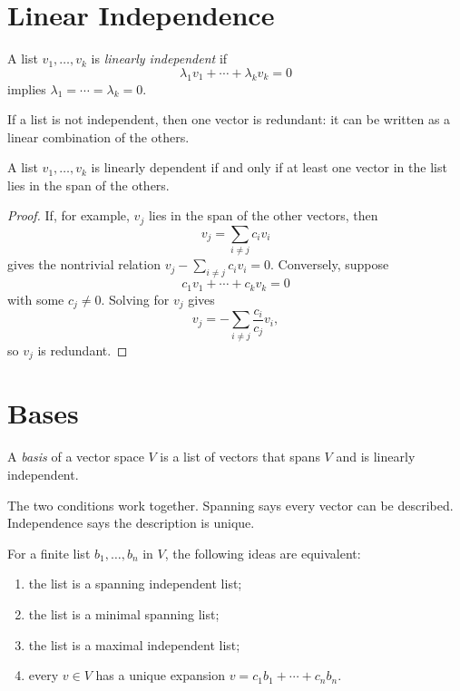\section{Linear Independence}

\begin{definition}
  A list $v_1,\ldots,v_k$ is \emph{linearly independent} if
  \[
    \lambda_1v_1+\cdots+\lambda_kv_k=0
  \]
  implies $\lambda_1=\cdots=\lambda_k=0$.
\end{definition}

If a list is not independent, then one vector is redundant: it can be written
as a linear combination of the others.

\begin{proposition}
A list $v_1,\ldots,v_k$ is linearly dependent if and only if at least one
vector in the list lies in the span of the others.
\end{proposition}

\begin{proof}
If, for example, $v_j$ lies in the span of the other vectors, then
\[
  v_j=\sum_{i\ne j} c_i v_i
\]
gives the nontrivial relation $v_j-\sum_{i\ne j}c_i v_i=0$.
Conversely, suppose
\[
  c_1v_1+\cdots+c_kv_k=0
\]
with some $c_j\ne 0$. Solving for $v_j$ gives
\[
  v_j=-\sum_{i\ne j}\frac{c_i}{c_j}v_i,
\]
so $v_j$ is redundant.
\end{proof}

\section{Bases}

\begin{definition}
  A \emph{basis} of a vector space $V$ is a list of vectors that spans $V$ and
  is linearly independent.
\end{definition}

The two conditions work together. Spanning says every vector can be described.
Independence says the description is unique.

\begin{proposition}
For a finite list $b_1,\ldots,b_n$ in $V$, the following ideas are equivalent:
\begin{enumerate}
  \item the list is a spanning independent list;
  \item the list is a minimal spanning list;
  \item the list is a maximal independent list;
  \item every $v\in V$ has a unique expansion
  $v=c_1b_1+\cdots+c_nb_n$.
\end{enumerate}
\end{proposition}

